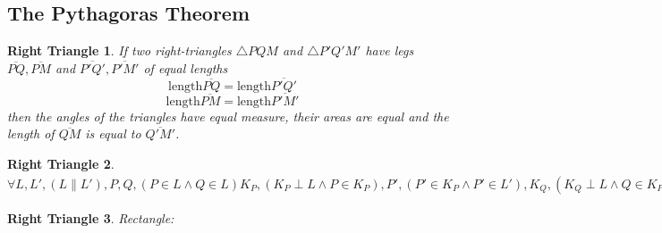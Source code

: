\subsection{The Pythagoras Theorem}
\theoremstyle{plain}
\newtheorem{righttriangle}{Right Triangle}[section]
\begin{righttriangle}
If two right-triangles $\triangle PQM$ and $\triangle P'Q'M'$ have legs $\overline{PQ}, \overline {PM}$ and $\overline{P'Q'}, \overline{P'M'}$ of equal lengths
\[
\text{length} \overline{PQ} = \text{length} \overline{P'Q'}
\]
\[
\text{length} \overline{PM} = \text{length} \overline{P'M'}
\]
then the angles of the triangles have equal measure, their areas are equal and the length of $\overline{QM}$ is equal to $\overline{Q'M'}$.
\end{righttriangle}
\begin{righttriangle}
$\forall L, L', (L \parallel L'), P, Q, (P \in L \land Q \in L)
K_P, (K_P \perp L \land P \in K_P), P', (P' \in K_P \land P' \in L'),
K_Q, (K_Q \perp L \land Q \in K_P), Q', (Q' \in K_Q \land Q' \in L')
\implies \text{length}(\overline{PP'}) = \text{ length}(\overline{QQ'}) \implies d(P, P') = d(Q, Q')$
\end{righttriangle}
\begin{righttriangle}
Rectangle:
\end{righttriangle}
